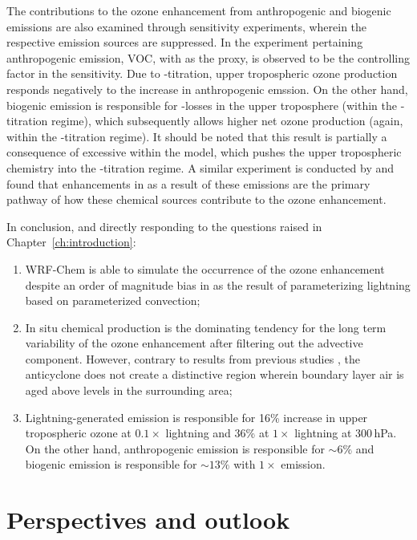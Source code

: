 The contributions to the ozone enhancement from anthropogenic and biogenic emissions are also examined
through sensitivity experiments, wherein the respective emission sources are suppressed. In the
experiment pertaining anthropogenic emission, VOC, with  as the proxy, is observed
to be the controlling factor in the sensitivity. Due to -titration, upper tropospheric
ozone production responds negatively to the increase in anthropogenic emssion. On the other hand, biogenic
emission is responsible for -losses in the upper troposphere (within the
-titration regime), which subsequently allows higher net ozone production (again,
within the -titration regime). It should be noted that this result is partially a consequence
of excessive {\lnox} within the model, which pushes the upper tropospheric chemistry into the -titration
regime. A similar experiment is conducted by \citet{Li:2005ss} and found that enhancements in  as a result of
these emissions are the primary pathway of how these chemical sources contribute to the ozone enhancement.

In conclusion, and directly responding to the questions raised in Chapter~\ref{ch:introduction}:
\begin{enumerate}
	\item WRF-Chem is able to simulate the occurrence of the ozone enhancement despite an
	order of magnitude bias in  as the result of parameterizing lightning based on
	parameterized convection;
	\item In situ chemical production is the dominating tendency for the long term variability of
	the ozone enhancement after filtering out the advective component. However, contrary to
	results from previous studies \citep[e.g.][]{Li:2005ss,Cooper:2007cr,Barth:2012qf}, the
	anticyclone does not create a distinctive region wherein boundary layer air is aged above
	levels in the surrounding area;
	\item Lightning-generated  emission is responsible for 16\% increase in upper
	tropospheric ozone at $0.1\times$ lightning and 36\% at $1\times$ lightning at 300\,\unit{hPa}.
	On the other hand, anthropogenic emission is responsible for $\sim6\%$ and biogenic
	emission is responsible for $\sim13\%$ with $1\times$ {\lnox} emission.
\end{enumerate}

\section{Perspectives and outlook}

